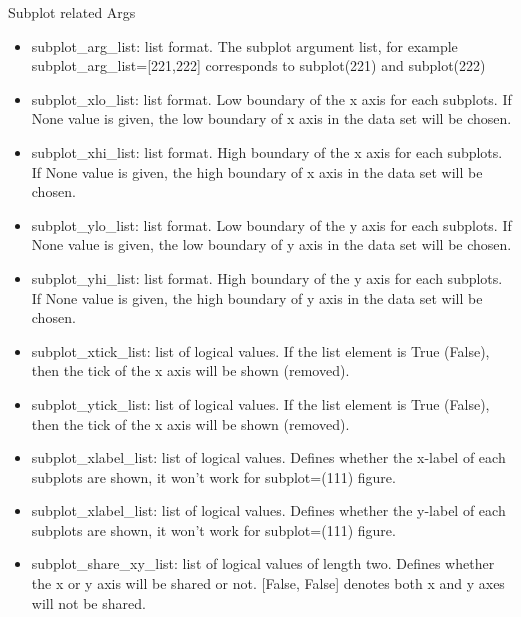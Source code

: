 \documentclass[12pt]{book}
\begin{document}
Subplot related Args
\begin{itemize}
\item subplot\_arg\_list: list format. The subplot argument list, for example subplot\_arg\_list=[221,222] corresponds to subplot(221) and subplot(222)
\item subplot\_xlo\_list: list format. Low boundary of the x axis for each subplots. If None value is given, the low boundary of x axis in the data set will be chosen.
\item subplot\_xhi\_list: list format. High boundary of the x axis for each subplots. If None value is given, the high boundary of x axis in the data set will be chosen.
\item subplot\_ylo\_list: list format. Low boundary of the y axis for each subplots. If None value is given, the low boundary of y axis in the data set will be chosen.
\item subplot\_yhi\_list: list format. High boundary of the y axis for each subplots. If None value is given, the high boundary of y axis in the data set will be chosen.
\item subplot\_xtick\_list: list of logical values. If the list element is True (False), then the tick of the x axis will be shown (removed). 
\item subplot\_ytick\_list: list of logical values. If the list element is True (False), then the tick of the x axis will be shown (removed).
\item subplot\_xlabel\_list: list of logical values. Defines whether the x-label of each subplots are shown, it won't work for subplot=(111) figure.
\item subplot\_xlabel\_list: list of logical values. Defines whether the y-label of each subplots are shown, it won't work for subplot=(111) figure.
\item subplot\_share\_xy\_list: list of logical values of length two. Defines whether the x or y axis will be shared or not. [False, False] denotes both x and y axes will not be shared. 
\end{itemize}
\end{document}
